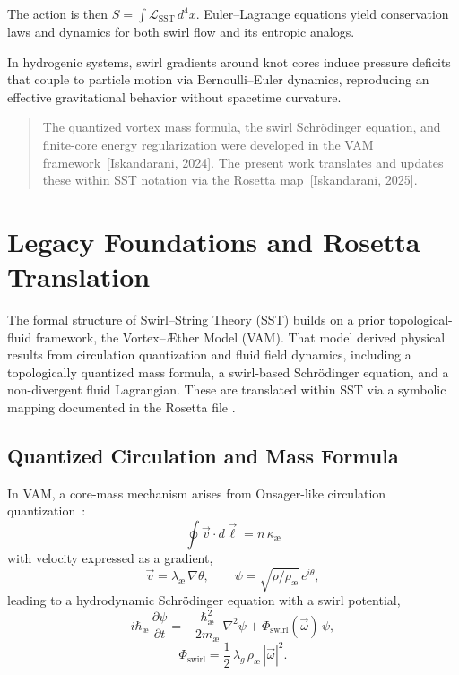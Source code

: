\documentclass[11pt]{article}
\begin{document}
    The action is then $S = \int \mathcal{L}_{\text{SST}} \, d^4x$. Euler–Lagrange equations yield conservation laws and dynamics for both swirl flow and its entropic analogs.

    In hydrogenic systems, swirl gradients around knot cores induce pressure deficits that couple to particle motion via Bernoulli–Euler dynamics, reproducing an effective gravitational behavior without spacetime curvature.

    \begin{quote}
    The quantized vortex mass formula, the swirl Schrödinger equation, and finite-core energy regularization were developed in the VAM framework~[Iskandarani, 2024]. The present work translates and updates these within SST notation via the Rosetta map~[Iskandarani, 2025]. %
    \end{quote}



\section{Legacy Foundations and Rosetta Translation}
\label{sec:legacy-rosetta}

    The formal structure of Swirl–String Theory (SST) builds on a prior topological-fluid framework, the Vortex–Æther Model (VAM). That model derived physical results from circulation quantization and fluid field dynamics, including a topologically quantized mass formula, a swirl-based Schrödinger equation, and a non-divergent fluid Lagrangian. These are translated within SST via a symbolic mapping documented in the Rosetta file \cite{VAM-15, vamrosetta2025}.

    \subsection{Quantized Circulation and Mass Formula}

        In VAM, a core-mass mechanism arises from Onsager-like circulation quantization~\cite{onsager1949,feynman1955}:
        \begin{equation}
            \oint \vec{v} \cdot d\vec{\ell} = n \, \kappa_\text{\ae}
        \end{equation}
        with velocity expressed as a gradient,
        \begin{equation}
            \vec{v} = \lambda_\text{\ae} \, \nabla \theta, \qquad \psi = \sqrt{\rho/\rho_\text{\ae}}\, e^{i\theta},
        \end{equation}
        leading to a hydrodynamic Schrödinger equation with a swirl potential,
        \begin{equation}
            i\hbar_\text{\ae} \, \frac{\partial \psi}{\partial t} = -\frac{\hbar_\text{\ae}^2}{2m_\text{\ae}} \, \nabla^2 \psi + \Phi_{\text{swirl}}(\vec{\omega})\, \psi,
        \end{equation}
        \begin{equation}
            \Phi_{\text{swirl}} = \frac{1}{2} \, \lambda_g \, \rho_\text{\ae} \, |\vec{\omega}|^2.
        \end{equation}
\end{document}
